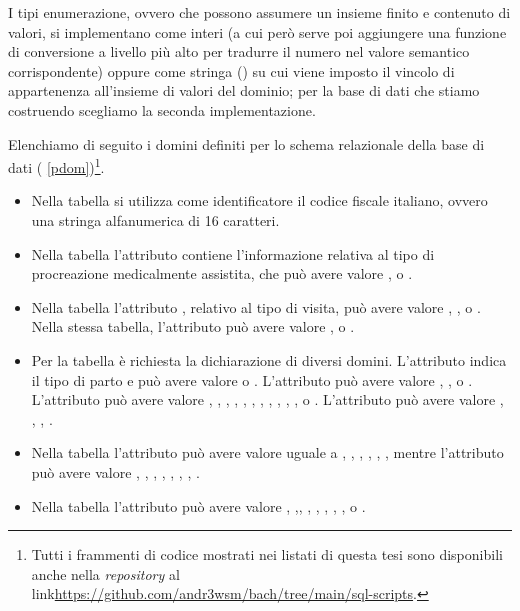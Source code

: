 I tipi enumerazione, ovvero che possono assumere un insieme finito e contenuto di valori, si implementano come interi (a cui però serve poi aggiungere una funzione di conversione a livello più alto per tradurre il numero nel valore semantico corrispondente) oppure come stringa () su cui viene imposto il vincolo di appartenenza all'insieme di valori del dominio; per la base di dati che stiamo costruendo scegliamo la seconda implementazione.

Elenchiamo di seguito i domini definiti per lo schema relazionale della base di dati (\lstlistingname{} \ref{pdom})\footnote{
  Tutti i frammenti di codice mostrati nei listati di questa tesi sono disponibili anche nella \emph{repository} al link\linebreak \url{https://github.com/andr3wsm/bach/tree/main/sql-scripts}.
}.

\begin{itemize}
\item Nella tabella  si utilizza come identificatore il codice fiscale italiano, ovvero una stringa alfanumerica di 16 caratteri.
\item Nella tabella  l'attributo  contiene l'informazione relativa al tipo di procreazione medicalmente assistita, che può avere valore ,  o .
\item Nella tabella  l'attributo , relativo al tipo di visita, può avere valore , ,  o . Nella stessa tabella, l'attributo  può avere valore ,  o .
\item Per la tabella  è richiesta la dichiarazione di diversi domini. L'attributo  indica il tipo di parto e può avere valore  o . L'attributo  può avere valore , ,  o . L'attributo  può avere valore , , , , , , , , , , ,  o . L'attributo  può avere valore , , , .
\item Nella tabella  l'attributo  può avere valore uguale a , , , , , , mentre l'attributo  può avere valore , , , , , , , .
\item Nella tabella  l'attributo  può avere valore , ,\linebreak {}, , , , , ,  o .
\end{itemize}


